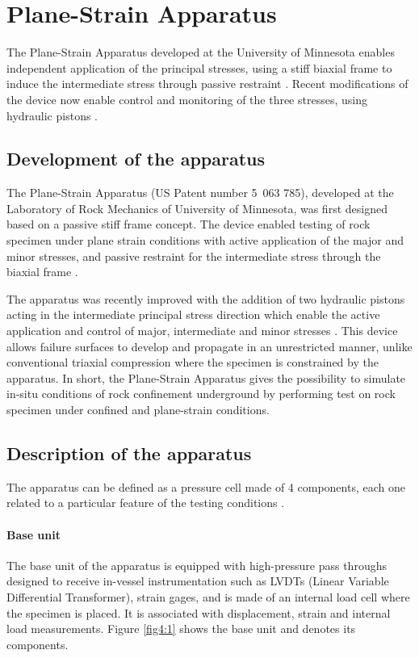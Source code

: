 \section{Plane-Strain Apparatus}

The Plane-Strain Apparatus developed at the University of Minnesota enables independent application of the principal stresses, using a stiff biaxial frame to induce the intermediate stress through passive restraint \cite{Labuz1996}. Recent modifications of the device now enable control and monitoring of the three stresses, using hydraulic pistons \cite{Zeng2019}.

\subsection{Development of the apparatus}

The Plane-Strain Apparatus (US Patent number 5 063 785), developed at the Laboratory of Rock Mechanics of University of Minnesota, was first designed based on a passive stiff frame concept. The device enabled testing of rock specimen under plane strain conditions with active application of the major and minor stresses, and passive restraint for the intermediate stress through the biaxial frame \cite{Labuz1996}. 

The apparatus was recently improved with the addition of two hydraulic pistons acting in the intermediate principal stress direction which enable the active application and control of major, intermediate and minor stresses \cite{Zeng2019}. This device allows failure surfaces to develop and propagate in an unrestricted manner, unlike conventional triaxial compression where the specimen is constrained by the apparatus. In short, the Plane-Strain Apparatus gives the possibility to simulate in-situ conditions of rock confinement underground by performing test on rock specimen under confined and plane-strain conditions. 

\subsection{Description of the apparatus}

The apparatus can be defined as a pressure cell made of 4 components, each one related to a particular feature of the testing conditions \cite{Labuz1996,Zeng2019}. 

\paragraph{Base unit} The base unit of the apparatus is equipped with high-pressure pass throughs designed to receive in-vessel instrumentation such as LVDTs (Linear Variable Differential Transformer), strain gages, and is made of an internal load cell where the specimen is placed. It is associated with displacement, strain and internal load measurements. Figure \ref{fig4:1} shows the base unit and denotes its components. 


